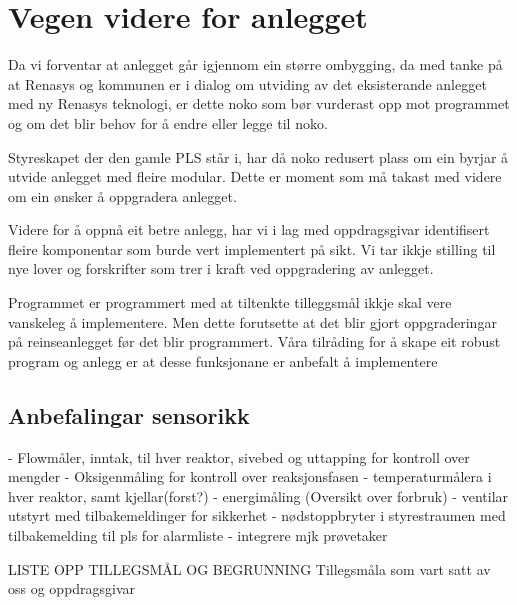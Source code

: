 \section{Vegen videre for anlegget}
\thispagestyle{fancy}

%

Da vi forventar at anlegget går igjennom ein større ombygging, da med tanke på at Renasys og kommunen er i dialog om utviding 
av det eksisterande anlegget med ny Renasys teknologi, er dette noko som bør vurderast opp mot programmet 
og om det blir behov for å endre eller legge til noko. 

Styreskapet der den gamle PLS står i, har då noko redusert plass om ein byrjar å utvide anlegget med fleire modular. 
Dette er moment som må takast med videre om ein ønsker å oppgradera anlegget.

Videre for å oppnå eit betre anlegg, har vi i lag med oppdragsgivar identifisert fleire komponentar som burde 
vert implementert på sikt. Vi tar ikkje stilling til nye lover og forskrifter som trer i kraft ved oppgradering av anlegget.

Programmet er programmert med at tiltenkte tilleggsmål ikkje skal vere vanskeleg å implementere. 
Men dette forutsette at det blir gjort oppgraderingar på reinseanlegget før det blir programmert. 
Våra tilråding for å skape eit robust program og anlegg er at desse funksjonane er anbefalt å implementere

\subsection{Anbefalingar sensorikk}

- Flowmåler, inntak, til hver reaktor, sivebed og uttapping for kontroll over mengder
- Oksigenmåling for kontroll over reaksjonsfasen
- temperaturmålera i hver reaktor, samt kjellar(forst?)
- energimåling (Oversikt over forbruk)
- ventilar utstyrt med tilbakemeldinger for sikkerhet
- nødstoppbryter i styrestraumen med tilbakemelding til pls for alarmliste
- integrere mjk prøvetaker


LISTE OPP TILLEGSMÅL OG BEGRUNNING
Tillegsmåla som vart satt av oss og oppdragsgivar



\newpage

